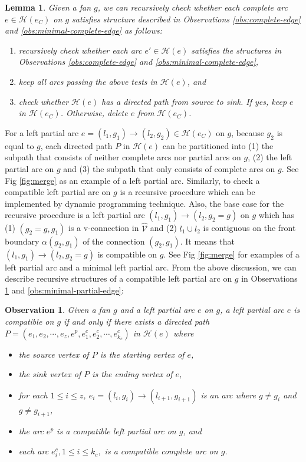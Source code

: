 \documentclass[11pt]{article}
\newcommand{\HH}{\mathcal{H}}
\newcommand{\VV}{\mathcal{V}}
\newtheorem{lemma}[figure]{Lemma}
\newtheorem{observation}[figure]{Observation}
\begin{document}
\begin{lemma}\label{lemma:complete-edge}
Given a fan $g$,
we can recursively check whether each complete arc $e\in \HH(e_C)$ on $g$
satisfies structure described in Observations \ref{obs:complete-edge} and \ref{obs:minimal-complete-edge} as follows:
\begin{enumerate}
\item recursively check whether each arc $e'\in \HH(e)$ satisfies the structures in Observations \ref{obs:complete-edge}
and \ref{obs:minimal-complete-edge},
\item keep all arcs passing the above tests in $\HH(e)$, and
\item check whether $\HH(e)$ has a directed path from source to sink. If yes, keep $e$ in $\HH(e_C)$.
Otherwise, delete $e$ from $\HH(e_C)$.
\end{enumerate}
\end{lemma}

For a left partial arc $e=(l_1, g_1)\rightarrow (l_2, g_2)\in \HH(e_C)$ on $g$,
because $g_2$ is equal to $g$,
each directed path $P$ in $\HH(e)$ can be partitioned into
(1) the subpath that consists of neither complete arcs nor partial arcs on $g$,
(2) the left partial arc on $g$ and
(3) the subpath that only consists of complete arcs on $g$.
See Fig \ref{fig:merge} as an example of a left partial arc.
Similarly, to check a compatible left partial arc on $g$ is a recursive procedure
which can be implemented by dynamic programming technique.
Also, the base case for the recursive procedure
is a left partial arc $(l_1, g_1) \rightarrow (l_2, g_2=g)$ on $g$
which has (1) $(g_2=g, g_1)$ is a v-connection in $\hat{\VV}$ and
(2) $l_1\cup l_2$ is contiguous on the front boundary $\alpha(g_2, g_1)$ of the connection $(g_2, g_1)$.
It means that $(l_1, g_1) \rightarrow (l_2, g_2=g)$ is compatible on $g$.
See Fig \ref{fig:merge} for examples of a left partial arc and a minimal left partial arc.
From the above discussion, we can describe recursive structures of a compatible
left partial arc on $g$ in Observations \ref{obs:partial-edge} and \ref{obs:minimal-partial-edge}:


\begin{observation}\label{obs:partial-edge}
Given a fan $g$ and a left partial arc $e$ on $g$,
a left partial arc $e$ is
compatible on $g$ if and only if
there exists a directed path $P=(e_1, e_2, \cdots, e_z, e^p, e^c_1, e^c_2, \cdots, e^c_{k_c})$
in $\HH(e)$ where
\begin{itemize}
\item the source vertex of $P$ is the starting vertex of $e$,
\item the sink vertex of $P$ is the ending vertex of $e$,
\item for each $1\leq i\leq z$, $e_i=(l_i, g_i)\rightarrow (l_{i+1}, g_{i+1})$
is an arc where $g \neq g_i$ and $g\neq g_{i+1}$,
\item the arc $e^p$ is a compatible left partial arc on $g$, and
\item each arc $e^c_i, 1\leq i\leq k_c,$ is a compatible complete arc on $g$.
\end{itemize}
\end{observation}
\end{document}
